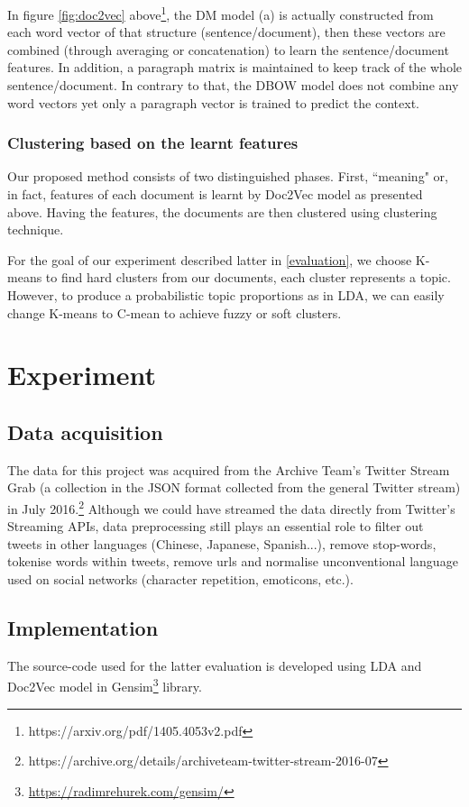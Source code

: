 \documentclass[11pt]{article}
\begin{document}
In figure \ref{fig:doc2vec} above\footnote{https://arxiv.org/pdf/1405.4053v2.pdf}, the DM model (a) is actually constructed from each word vector of that structure (sentence/document), then these vectors are combined (through averaging or concatenation) to learn the sentence/document features. In addition, a paragraph matrix is maintained to keep track of the whole sentence/document. In contrary to that, the DBOW model does not combine any word vectors yet only a paragraph vector is trained to predict the context.


\subsubsection{Clustering based on the learnt features}
Our proposed method consists of two distinguished phases. First, ``meaning" or, in fact, features of each document is learnt by Doc2Vec model as presented above. Having the features, the documents are then clustered using clustering technique. 

For the goal of our experiment described latter in \ref{evaluation}, we choose K-means to find hard clusters from our documents, each cluster represents a topic. However, to produce a probabilistic topic proportions as in LDA, we can easily change K-means to C-mean to achieve fuzzy or soft clusters.


\section{Experiment} \label{experiment}

\subsection{Data acquisition}
The data for this project was acquired from the Archive Team's Twitter Stream Grab (a collection in the JSON format collected from the general Twitter stream) in July 2016.\footnote{https://archive.org/details/archiveteam-twitter-stream-2016-07}  Although we could have streamed the data directly from Twitter's Streaming APIs, data preprocessing still plays an essential role to filter out tweets in other languages (Chinese, Japanese, Spanish...), remove stop-words, tokenise words within tweets, remove urls and normalise unconventional language used on social networks (character repetition, emoticons, etc.).

\subsection{Implementation}
The source-code used for the latter evaluation is developed using LDA and Doc2Vec model in Gensim\footnote{\url{https://radimrehurek.com/gensim/}} library.
\end{document}
